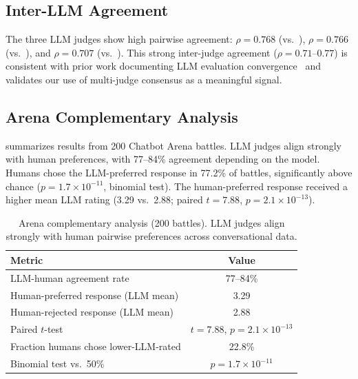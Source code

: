 \subsection{Inter-LLM Agreement}
\label{sec:agreement}

The three LLM judges show high pairwise agreement: $\rho = 0.768$ (\gptfourmini vs.\ \gptfo), $\rho = 0.766$ (\gptfo vs.\ \gptfomini), and $\rho = 0.707$ (\gptfourmini vs.\ \gptfomini).
This strong inter-judge agreement ($\rho = 0.71$--$0.77$) is consistent with prior work documenting LLM evaluation convergence~\citep{echoes2024} and validates our use of multi-judge consensus as a meaningful signal.

\subsection{Arena Complementary Analysis}
\label{sec:arena}

 summarizes results from 200 Chatbot Arena battles.
LLM judges align strongly with human preferences, with 77--84\% agreement depending on the model.
Humans chose the LLM-preferred response in 77.2\% of battles, significantly above chance ($p = 1.7 \times 10^{-11}$, binomial test).
The human-preferred response received a higher mean LLM rating (3.29 vs.\ 2.88; paired $t = 7.88$, $p = 2.1 \times 10^{-13}$).

\begin{table}[t]
    \centering
    \caption{Arena complementary analysis (200 battles). LLM judges align strongly with human pairwise preferences across conversational data.}
    \begin{tabular}{@{}lc@{}}
        \toprule
        \textbf{Metric} & \textbf{Value} \\
        \midrule
        LLM-human agreement rate & 77--84\% \\
        Human-preferred response (LLM mean) & 3.29 \\
        Human-rejected response (LLM mean) & 2.88 \\
        Paired $t$-test & $t = 7.88$, $p = 2.1 \times 10^{-13}$ \\
        Fraction humans chose lower-LLM-rated & 22.8\% \\
        Binomial test vs.\ 50\% & $p = 1.7 \times 10^{-11}$ \\
        \bottomrule
    \end{tabular}
    \label{tab:arena}
\end{table}
